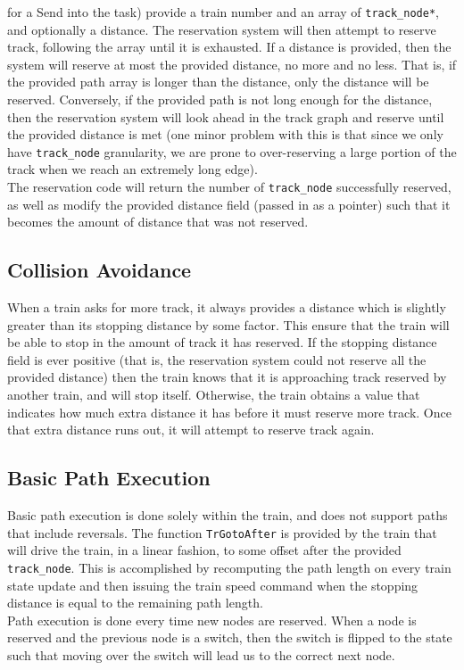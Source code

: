 \documentclass[12pt]{article}
\begin{document}
for a Send into the task) provide a train number and an array of \texttt{track\_node*}, and optionally a distance. The 
reservation system will then attempt to reserve track, following the array until it is exhausted. If a distance is
provided, then the system will reserve at most the provided distance, no more and no less. That is, if the provided path
array is longer than the distance, only the distance will be reserved. Conversely, if the provided path is not long
enough for the distance, then the reservation system will look ahead in the track graph and reserve until the provided
distance is met (one minor problem with this is that since we only have \texttt{track\_node} granularity, we are prone
to over-reserving a large portion of the track when we reach an extremely long edge).
\\
The reservation code will return the number of \texttt{track\_node} successfully reserved, as well as modify the
provided distance field (passed in as a pointer) such that it becomes the amount of distance that was not reserved.
\\[1\baselineskip]
\subsection{Collision Avoidance}
When a train asks for more track, it always provides a distance which is slightly greater than its stopping distance by
some factor. This ensure that the train will be able to stop in the amount of track it has reserved. If the stopping
distance field is ever positive (that is, the reservation system could not reserve all the provided distance) then the
train knows that it is approaching track reserved by another train, and will stop itself. Otherwise, the train obtains a
value that indicates how much extra distance it has before it must reserve more track. Once that extra distance runs
out, it will attempt to reserve track again.
\\[1\baselineskip]
\subsection{Basic Path Execution}
Basic path execution is done solely within the train, and does not support paths that include reversals. The function
\texttt{TrGotoAfter} is provided by the train that will drive the train, in a linear fashion, to some offset after the
provided \texttt{track\_node}. This is accomplished by recomputing the path length on every train state update and then
issuing the train speed command when the stopping distance is equal to the remaining path length.
\\
Path execution is done every time new nodes are reserved. When a node is reserved and the previous node is a switch,
then the switch is flipped to the state such that moving over the switch will lead us to the correct next node.
\\[1\baselineskip]
\end{document}
